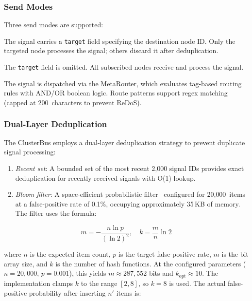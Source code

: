 \documentclass[journal,10pt]{IEEEtran}
\newcommand{\code}[1]{\texttt{#1}}
\begin{document}
\subsubsection{Send Modes}

Three send modes are supported:

\begin{description}[nosep,style=unboxed,leftmargin=0pt,font=\normalfont\itshape]
\item[Unicast.] The signal carries a \code{target} field specifying the destination node ID. Only the targeted node processes the signal; others discard it after deduplication.
\item[Broadcast.] The \code{target} field is omitted. All subscribed nodes receive and process the signal.
\item[Routed.] The signal is dispatched via the MetaRouter, which evaluates tag-based routing rules with AND/OR boolean logic. Route patterns support regex matching (capped at 200~characters to prevent ReDoS).
\end{description}

\subsubsection{Dual-Layer Deduplication}

The ClusterBus employs a dual-layer deduplication strategy to prevent duplicate signal processing:

\begin{enumerate}[nosep]
\item \emph{Recent set}: A bounded set of the most recent 2{,}000 signal IDs provides exact deduplication for recently received signals with O(1) lookup.
\item \emph{Bloom filter}: A space-efficient probabilistic filter~\cite{bloom1970} configured for 20{,}000~items at a false-positive rate of 0.1\%, occupying approximately 35\,KB of memory. The filter uses the formula:
\end{enumerate}

\begin{equation}
m = -\frac{n \ln p}{(\ln 2)^2}, \quad k = \frac{m}{n} \ln 2
\label{eq:bloom}
\end{equation}

\noindent where $n$ is the expected item count, $p$ is the target false-positive rate, $m$ is the bit array size, and $k$ is the number of hash functions. At the configured parameters ($n=20{,}000$, $p=0.001$), this yields $m \approx 287{,}552$ bits and $k_{\text{opt}} \approx 10$. The implementation clamps $k$ to the range $[2, 8]$, so $k = 8$ is used. The actual false-positive probability after inserting $n'$ items is:
\end{document}
